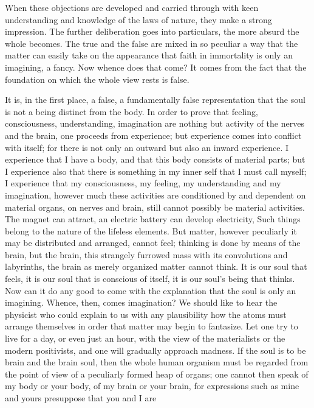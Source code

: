 \documentclass[12pt,a4paper,openany]{book}
\newcommand{\opage}[1]{\marginnote{\footnotesize\textit{[#1]}}}
\begin{document}
When these objections are developed and carried through with keen understanding and knowledge of the laws of nature,
they make a strong impression. The further deliberation goes into particulars, the more absurd the whole becomes. The
true and the false are mixed in so peculiar a way that the matter can easily take on the appearance that faith in
immortality is only an imagining, a fancy. Now whence does that come? It comes from the fact that the foundation on
which the whole view rests is false.

It is, in the first place, a false, a fundamentally false representation that the soul is not a being distinct from
the body. In order to prove that feeling, consciousness, understanding, imagination are nothing but activity of the
nerves and the brain, one proceeds from experience; but experience comes into conflict with itself; for there is not
only an outward but also an inward experience. I experience that I have a body, and that this body consists of material
parts; but I experience also that there is something in my inner self that I must call myself; I experience that my
consciousness, my feeling, my understanding and my imagination,
\setcounter{footnote}{0}%
\opage{19}however much these activities are conditioned by and dependent on material organs, on nerves and brain, still
cannot possibly be material activities. The magnet can attract, an electric battery can develop electricity, Such
things belong to the nature of the lifeless elements. But matter, however peculiarly it may be distributed and
arranged, cannot feel; thinking is done by means of the brain, but the brain, this strangely furrowed mass with its
convolutions and labyrinths, the brain as merely organized matter cannot think. It is our soul that feels, it is our
soul that is conscious of itself, it is our soul's being that thinks. Now can it do any good to come with the
explanation that the soul is only an imagining. Whence, then, comes imagination? We should like to hear the physicist
who could explain to us with any plausibility how the atoms must arrange themselves in order that matter may begin to
fantasize. Let one try to live for a day, or even just an hour, with the view of the materialists or the modern
positivists, and one will gradually approach madness. If the soul is to be brain and the brain soul, then the whole
human organism must be regarded from the point of view of a peculiarly formed heap of organs; one cannot then speak of
my body or your body, of my brain or your brain, for expressions such as mine and yours presuppose that you and I are
\end{document}
